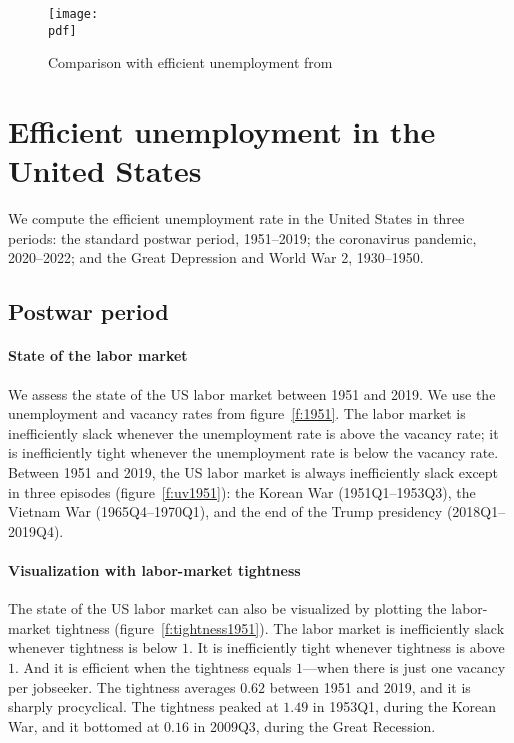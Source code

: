 \documentclass[letterpaper,12pt,leqno]{article}
\newcommand{\pdf}{figures.pdf}
\begin{document}
\begin{figure}[t]
\texttt{[image: \\pdf]}
\caption{Comparison with efficient unemployment from \citet{MS16}}
\label{f:comparison}\end{figure}


\section{Efficient unemployment in the United States}\label{s:postwar}

We compute the efficient unemployment rate in the United States in three periods: the standard postwar period, 1951--2019; the coronavirus pandemic, 2020--2022; and the Great Depression and World War 2, 1930--1950.

\subsection{Postwar period}

\paragraph{State of the labor market} We assess the state of the US labor market between 1951 and 2019. We use the unemployment and vacancy rates from figure~\ref{f:1951}. The labor market is inefficiently slack whenever the unemployment rate is above the vacancy rate; it is inefficiently tight whenever the unemployment rate is below the vacancy rate. Between 1951 and 2019, the US labor market is always inefficiently slack except in three episodes (figure~\ref{f:uv1951}): the Korean War (1951Q1--1953Q3), the Vietnam War (1965Q4--1970Q1), and the end of the Trump presidency (2018Q1--2019Q4).

\paragraph{Visualization with labor-market tightness} The state of the US labor market can also be visualized by plotting the labor-market tightness (figure~\ref{f:tightness1951}). The labor market is inefficiently slack whenever tightness is below $1$. It is inefficiently tight whenever tightness is above $1$. And it is efficient when the tightness equals $1$---when there is just one vacancy per jobseeker. The tightness averages $0.62$ between 1951 and 2019, and it is sharply procyclical. The tightness peaked at $1.49$ in 1953Q1, during the Korean War, and it bottomed at $0.16$ in 2009Q3, during the Great Recession.
\end{document}
